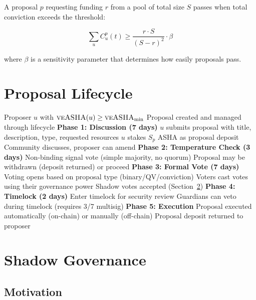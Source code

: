 \documentclass[11pt,a4paper]{article}
\newcommand{\veasha}{\textsc{veASHA}\xspace}
\begin{document}
A proposal $p$ requesting funding $r$ from a pool of total size $S$ passes when total conviction exceeds the threshold:

\begin{equation}
    \sum_u C_u^p(t) \geq \frac{r \cdot S}{(S - r)^2} \cdot \beta
\end{equation}

where $\beta$ is a sensitivity parameter that determines how easily proposals pass.

\section{Proposal Lifecycle}

\begin{algorithm}[H]
\caption{Proposal Lifecycle}
\label{alg:lifecycle}
\begin{algorithmic}[1]
\Require Proposer $u$ with $\veasha(u) \geq \veasha_{\min}$
\Ensure Proposal created and managed through lifecycle
\Statex \textbf{Phase 1: Discussion (7 days)}
\State $u$ submits proposal with title, description, type, requested resources
\State $u$ stakes $S_p$ ASHA as proposal deposit
\State Community discusses, proposer can amend
\Statex \textbf{Phase 2: Temperature Check (3 days)}
\State Non-binding signal vote (simple majority, no quorum)
    \State Proposal may be withdrawn (deposit returned) or proceed
\EndIf
\Statex \textbf{Phase 3: Formal Vote (7 days)}
\State Voting opens based on proposal type (binary/QV/conviction)
\State Voters cast votes using their governance power
\State Shadow votes accepted (Section~\ref{sec:shadow})
\Statex \textbf{Phase 4: Timelock (2 days)}
    \State Enter timelock for security review
    \State Guardians can veto during timelock (requires 3/7 multisig)
\EndIf
\Statex \textbf{Phase 5: Execution}
\State Proposal executed automatically (on-chain) or manually (off-chain)
\State Proposal deposit returned to proposer
\end{algorithmic}
\end{algorithm}

\section{Shadow Governance}
\label{sec:shadow}

\subsection{Motivation}
\end{document}
